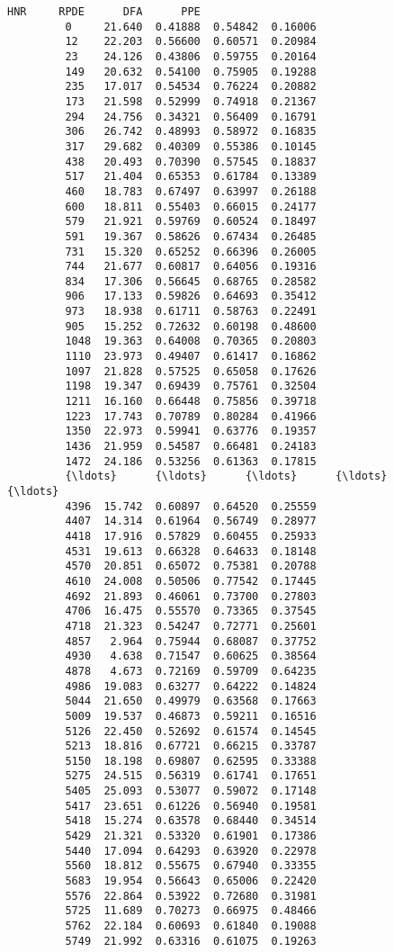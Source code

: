\documentclass[11pt]{article}
\begin{document}
\begin{Verbatim}[commandchars=\\\{\}]
                  HNR     RPDE      DFA      PPE  
         0     21.640  0.41888  0.54842  0.16006  
         12    22.203  0.56600  0.60571  0.20984  
         23    24.126  0.43806  0.59755  0.20164  
         149   20.632  0.54100  0.75905  0.19288  
         235   17.017  0.54534  0.76224  0.20882  
         173   21.598  0.52999  0.74918  0.21367  
         294   24.756  0.34321  0.56409  0.16791  
         306   26.742  0.48993  0.58972  0.16835  
         317   29.682  0.40309  0.55386  0.10145  
         438   20.493  0.70390  0.57545  0.18837  
         517   21.404  0.65353  0.61784  0.13389  
         460   18.783  0.67497  0.63997  0.26188  
         600   18.811  0.55403  0.66015  0.24177  
         579   21.921  0.59769  0.60524  0.18497  
         591   19.367  0.58626  0.67434  0.26485  
         731   15.320  0.65252  0.66396  0.26005  
         744   21.677  0.60817  0.64056  0.19316  
         834   17.306  0.56645  0.68765  0.28582  
         906   17.133  0.59826  0.64693  0.35412  
         973   18.938  0.61711  0.58763  0.22491  
         905   15.252  0.72632  0.60198  0.48600  
         1048  19.363  0.64008  0.70365  0.20803  
         1110  23.973  0.49407  0.61417  0.16862  
         1097  21.828  0.57525  0.65058  0.17626  
         1198  19.347  0.69439  0.75761  0.32504  
         1211  16.160  0.66448  0.75856  0.39718  
         1223  17.743  0.70789  0.80284  0.41966  
         1350  22.973  0.59941  0.63776  0.19357  
         1436  21.959  0.54587  0.66481  0.24183  
         1472  24.186  0.53256  0.61363  0.17815  
         {\ldots}      {\ldots}      {\ldots}      {\ldots}      {\ldots}  
         4396  15.742  0.60897  0.64520  0.25559  
         4407  14.314  0.61964  0.56749  0.28977  
         4418  17.916  0.57829  0.60455  0.25933  
         4531  19.613  0.66328  0.64633  0.18148  
         4570  20.851  0.65072  0.75381  0.20788  
         4610  24.008  0.50506  0.77542  0.17445  
         4692  21.893  0.46061  0.73700  0.27803  
         4706  16.475  0.55570  0.73365  0.37545  
         4718  21.323  0.54247  0.72771  0.25601  
         4857   2.964  0.75944  0.68087  0.37752  
         4930   4.638  0.71547  0.60625  0.38564  
         4878   4.673  0.72169  0.59709  0.64235  
         4986  19.083  0.63277  0.64222  0.14824  
         5044  21.650  0.49979  0.63568  0.17663  
         5009  19.537  0.46873  0.59211  0.16516  
         5126  22.450  0.52692  0.61574  0.14545  
         5213  18.816  0.67721  0.66215  0.33787  
         5150  18.198  0.69807  0.62595  0.33388  
         5275  24.515  0.56319  0.61741  0.17651  
         5405  25.093  0.53077  0.59072  0.17148  
         5417  23.651  0.61226  0.56940  0.19581  
         5418  15.274  0.63578  0.68440  0.34514  
         5429  21.321  0.53320  0.61901  0.17386  
         5440  17.094  0.64293  0.63920  0.22978  
         5560  18.812  0.55675  0.67940  0.33355  
         5683  19.954  0.56643  0.65006  0.22420  
         5576  22.864  0.53922  0.72680  0.31981  
         5725  11.689  0.70273  0.66975  0.48466  
         5762  22.184  0.60693  0.61840  0.19088  
         5749  21.992  0.63316  0.61075  0.19263  
         

\end{Verbatim}
\end{document}
